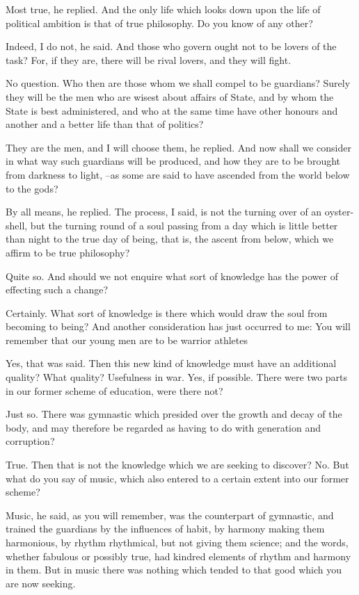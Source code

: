 Most true, he replied.
And the only life which looks down upon the life of political ambition is that of true philosophy. Do you know of any other?

Indeed, I do not, he said.
And those who govern ought not to be lovers of the task? For, if they are, there will be rival lovers, and they will fight.

No question.
Who then are those whom we shall compel to be guardians? Surely they will be the men who are wisest about affairs of State, and by whom the State is best administered, and who at the same time have other honours and another and a better life than that of politics?

They are the men, and I will choose them, he replied.
And now shall we consider in what way such guardians will be produced, and how they are to be brought from darkness to light, --as some are said to have ascended from the world below to the gods?

By all means, he replied.
The process, I said, is not the turning over of an oyster-shell, but the turning round of a soul passing from a day which is little better than night to the true day of being, that is, the ascent from below, which we affirm to be true philosophy?

Quite so.
And should we not enquire what sort of knowledge has the power of effecting such a change?

Certainly.
What sort of knowledge is there which would draw the soul from becoming to being? And another consideration has just occurred to me: You will remember that our young men are to be warrior athletes

Yes, that was said.
Then this new kind of knowledge must have an additional quality?
What quality?
Usefulness in war.
Yes, if possible.
There were two parts in our former scheme of education, were there not?

Just so.
There was gymnastic which presided over the growth and decay of the body, and may therefore be regarded as having to do with generation and corruption?

True.
Then that is not the knowledge which we are seeking to discover? No.
But what do you say of music, which also entered to a certain extent into our former scheme?

Music, he said, as you will remember, was the counterpart of gymnastic, and trained the guardians by the influences of habit, by harmony making them harmonious, by rhythm rhythmical, but not giving them science; and the words, whether fabulous or possibly true, had kindred elements of rhythm and harmony in them. But in music there was nothing which tended to that good which you are now seeking.

